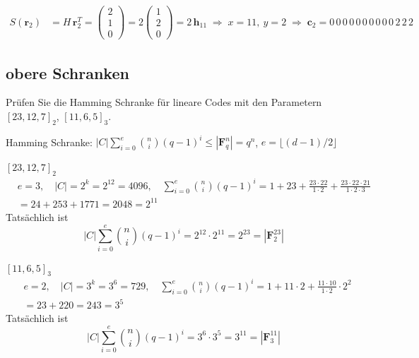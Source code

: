\begin{loesung}
\begin{enumerate}[label=\alph*)]
\begin{align*}
S(\mathbf{r}_2) &= H\,\mathbf{r}_2^T = \begin{pmatrix} 2\\ 1\\ 0 \end{pmatrix} = 2\begin{pmatrix} 1\\ 2\\ 0 \end{pmatrix} = 2\,\mathbf{h}_{11}
\;\Rightarrow\; x = 11,\ y = 2 \;\Rightarrow\; \mathbf{c}_2 = 0\,0\,0\,0\,0\,0\,0\,0\,0\,0\,2\,2\,2
\end{align*}
\end{enumerate}
\end{loesung}

\subsection{obere Schranken}

\begin{aufgabe}[5\_6]
Prüfen Sie die Hamming Schranke für lineare Codes mit den Parametern $[23, 12, 7]_2$, $[11, 6, 5]_3$.
\end{aufgabe}

\begin{loesung}
Hamming Schranke: \quad $|C| \displaystyle\sum_{i=0}^{e} \binom{n}{i} (q-1)^i \le |\mathbf{F}_q^n| = q^n$, \quad $e = \lfloor (d-1)/2 \rfloor$

$[23, 12, 7]_2$
\begin{align*}
& e = 3,\quad |C| = 2^k = 2^{12} = 4096,\quad
\sum_{i=0}^{e} \binom{n}{i} (q-1)^i = 1 + 23 + \frac{23\cdot 22}{1\cdot 2} + \frac{23\cdot 22\cdot 21}{1\cdot 2\cdot 3}\\
&= 24 + 253 + 1771 = 2048 = 2^{11}
\end{align*}
Tatsächlich ist
\[
|C| \sum_{i=0}^{e} \binom{n}{i} (q-1)^i = 2^{12}\cdot 2^{11} = 2^{23} = |\mathbf{F}_2^{23}|
\]

$[11, 6, 5]_3$
\begin{align*}
& e = 2,\quad |C| = 3^k = 3^6 = 729,\quad
\sum_{i=0}^{e} \binom{n}{i} (q-1)^i = 1 + 11\cdot 2 + \frac{11\cdot 10}{1\cdot 2}\cdot 2^2\\
&= 23 + 220 = 243 = 3^5
\end{align*}
Tatsächlich ist
\[
|C| \sum_{i=0}^{e} \binom{n}{i} (q-1)^i = 3^{6}\cdot 3^{5} = 3^{11} = |\mathbf{F}_3^{11}|
\]
\end{loesung}

